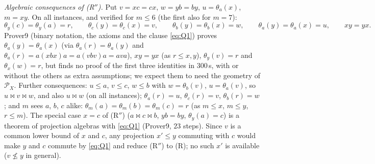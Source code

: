 \documentclass[11pt]{amsart}
\theoremstyle{definition}
\renewcommand{\P}{\mathcal{P}}
\newcommand{\mt}{\bowtie}   %
\begin{document}
\smallskip
\emph{Algebraic consequences of (R$''$).} Put $v=xc=cx$, $w=yb=by$, $u=\theta_a(x)$, $m=xy$. On all instances, and verified for $m\le6$ (the first also for $m=7$):
\[
\theta_y(c)=\theta_y(a)=r,\qquad \theta_c(y)=\theta_c(x)=v,\qquad \theta_b(y)=\theta_b(x)=w,\qquad \theta_a(y)=\theta_a(x)=u,\qquad xy=yx .
\]
Prover9 (binary notation, the axioms and the clause \eqref{eq:Q1}) proves $\theta_a(y)=\theta_a(x)$ (via $\theta_a(r)=\theta_a(y)$ and $\theta_a(r)=a(xbx)a=a(vbv)a=ava$), $xy=yx$ (as $r\le x,y$), $\theta_y(v)=r$ and $\theta_x(w)=r$, but finds no proof of the first three identities in $300$\,s, with or without the others as extra assumptions; we expect them to need the geometry of $\P_X$. Further consequences: $u\le a$, $v\le c$, $w\le b$ with $w=\theta_b(v)$, $u=\theta_a(v)$, so $u\mt v\mt w$, and also $u\mt w$ (on all instances); $\theta_a(r)=u$, $\theta_c(r)=v$, $\theta_b(r)=w$; and $m$ sees $a$, $b$, $c$ alike: $\theta_m(a)=\theta_m(b)=\theta_m(c)=r$ (as $m\le x$, $m\le y$, $r\le m$). The special case $x=c$ of (R$''$) ($a\mt c\mt b$, $yb=by$, $\theta_y(a)=c$) is a theorem of projection algebras with \eqref{eq:Q1} (Prover9, $23$ steps). Since $v$ is a common lower bound of $x$ and $c$, any projection $x'\le y$ commuting with $c$ would make $y$ and $c$ commute by \eqref{eq:Q1} and reduce (R$''$) to (R); no such $x'$ is available ($v\not\le y$ in general).
\end{document}
